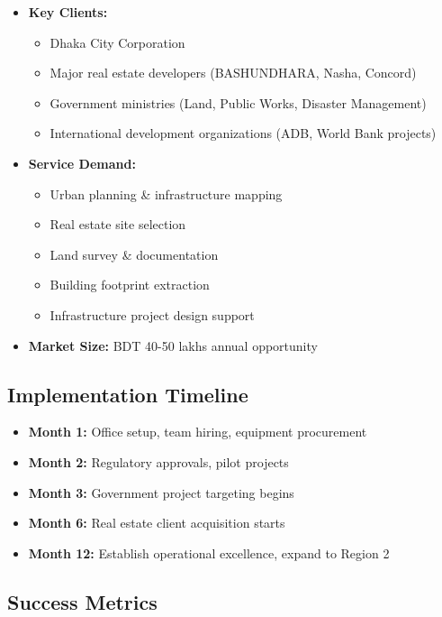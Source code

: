 \begin{itemize}
    \item \textbf{Key Clients:}
    \begin{itemize}
        \item Dhaka City Corporation
        \item Major real estate developers (BASHUNDHARA, Nasha, Concord)
        \item Government ministries (Land, Public Works, Disaster Management)
        \item International development organizations (ADB, World Bank projects)
    \end{itemize}

    \item \textbf{Service Demand:}
    \begin{itemize}
        \item Urban planning \& infrastructure mapping
        \item Real estate site selection
        \item Land survey \& documentation
        \item Building footprint extraction
        \item Infrastructure project design support
    \end{itemize}

    \item \textbf{Market Size:} BDT 40-50 lakhs annual opportunity
\end{itemize}

\subsection{Implementation Timeline}

\begin{itemize}
    \item \textbf{Month 1:} Office setup, team hiring, equipment procurement
    \item \textbf{Month 2:} Regulatory approvals, pilot projects
    \item \textbf{Month 3:} Government project targeting begins
    \item \textbf{Month 6:} Real estate client acquisition starts
    \item \textbf{Month 12:} Establish operational excellence, expand to Region 2
\end{itemize}

\subsection{Success Metrics}

